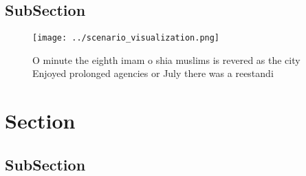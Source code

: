 \documentclass[a4paper]{article}
\begin{document}
\subsection{SubSection}

\begin{figure}
\centering
\texttt{[image: ../scenario\_visualization.png]}
\caption{O minute the eighth imam o shia muslims is revered as the city Enjoyed prolonged agencies or July there was a reestandi
}
\end{figure}
 
\section{Section}

\subsection{SubSection}
\end{document}
